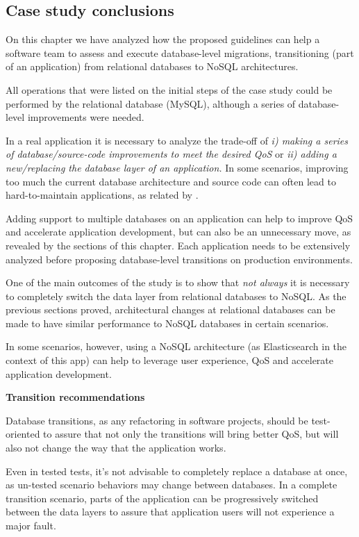 \subsection{Case study conclusions}
On this chapter we have analyzed how the proposed guidelines can help a software team to assess and execute database-level migrations, transitioning (part of an application) from relational databases to NoSQL architectures.

All operations that were listed on the initial steps of the case study could be performed by the relational database (MySQL), although a series of database-level improvements were needed. 

In a real application it is necessary to analyze the trade-off of \textit{i) making a series of database/source-code improvements to meet the desired QoS} or \textit{ii) adding a new/replacing the database layer of an application.} In some scenarios, improving too much the current database architecture and source code can often lead to hard-to-maintain applications, as related by \cite{scoutmigration}. 

Adding support to multiple databases on an application can help to improve QoS and accelerate application development, but can also be an unnecessary move, as revealed by the sections of this chapter. Each application needs to be extensively analyzed before proposing database-level transitions on production environments. 

One of the main outcomes of the study is to show that \textit{not always} it is necessary to completely switch the data layer from relational databases to NoSQL. As the previous sections proved, architectural changes at relational databases can be made to have similar performance to NoSQL databases in certain scenarios. 

In some scenarios, however, using a NoSQL architecture (as Elasticsearch in the context of this app) can help to leverage user experience, QoS and accelerate application development.  


\noindent \textbf{Transition recommendations}

Database transitions, as any refactoring in software projects, should be test-oriented to assure that not only the transitions will bring better QoS, but will also not change the way that the application works. 

Even in tested tests, it's not advisable to completely replace a database at once, as un-tested scenario behaviors may change between databases. In a complete transition scenario, parts of the application can be progressively switched between the data layers to assure that application users will not experience a major fault. 

